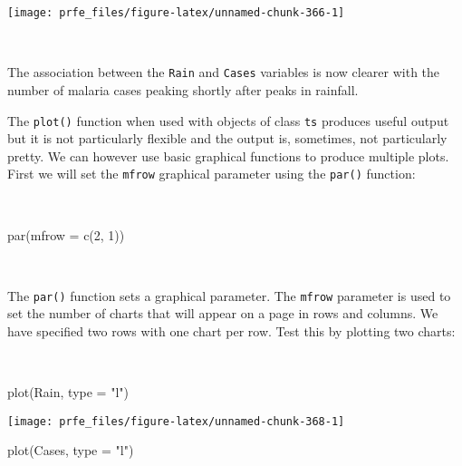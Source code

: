 \documentclass[
  12pt,
  a4paper]{book}
\newenvironment{Shaded}{\begin{snugshade}}{\end{snugshade}}
\newcommand{\AttributeTok}[1]{\textcolor[rgb]{0.77,0.63,0.00}{#1}}
\newcommand{\DecValTok}[1]{\textcolor[rgb]{0.00,0.00,0.81}{#1}}
\newcommand{\FunctionTok}[1]{\textcolor[rgb]{0.00,0.00,0.00}{#1}}
\newcommand{\NormalTok}[1]{#1}
\newcommand{\StringTok}[1]{\textcolor[rgb]{0.31,0.60,0.02}{#1}}
\begin{document}
\begin{center}\texttt{[image: prfe\_files/figure-latex/unnamed-chunk-366-1]} \end{center}

~

The association between the \texttt{Rain} and \texttt{Cases} variables is now clearer with the number of malaria cases peaking shortly after peaks in rainfall.

The \texttt{plot()} function when used with objects of class \texttt{ts} produces useful output but it is not particularly flexible and the output is, sometimes, not particularly pretty. We can however use basic graphical functions to produce multiple plots. First we will set the \texttt{mfrow} graphical parameter using the \texttt{par()} function:

~

\begin{Shaded}
\begin{Highlighting}[]
\FunctionTok{par}\NormalTok{(}\AttributeTok{mfrow =} \FunctionTok{c}\NormalTok{(}\DecValTok{2}\NormalTok{, }\DecValTok{1}\NormalTok{))}
\end{Highlighting}
\end{Shaded}

~

The \texttt{par()} function sets a graphical parameter. The \texttt{mfrow} parameter is used to set the number of charts that will appear on a page in rows and columns. We have specified two rows with one chart per row. Test this by plotting two charts:

~

\begin{Shaded}
\begin{Highlighting}[]
\FunctionTok{plot}\NormalTok{(Rain, }\AttributeTok{type =} \StringTok{"l"}\NormalTok{)}
\end{Highlighting}
\end{Shaded}

\begin{center}\texttt{[image: prfe\_files/figure-latex/unnamed-chunk-368-1]} \end{center}

\begin{Shaded}
\begin{Highlighting}[]
\FunctionTok{plot}\NormalTok{(Cases, }\AttributeTok{type =} \StringTok{"l"}\NormalTok{)}
\end{Highlighting}
\end{Shaded}
\end{document}
